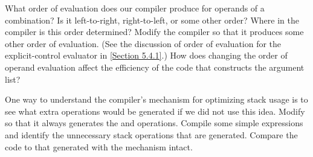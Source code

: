 \begin{exercise}
	\label{Exercise 5.36}
	What order of evaluation does our compiler produce for operands of a combination?
	Is it left-to-right, right-to-left, or some other order?
	Where in the compiler is this order determined?
	Modify the compiler so that it produces some other order of evaluation.
	(See the discussion of order of evaluation for the explicit-control evaluator in \cref{Section 5.4.1}.)
	How does changing the order of operand evaluation affect the efficiency of the code that constructs the argument list?
\end{exercise}



\begin{exercise}
	\label{Exercise 5.37}
	One way to understand the compiler’s  mechanism for optimizing stack usage is to see what extra operations would be generated if we did not use this idea.
	Modify  so that it always generates the  and  operations.
	Compile some simple expressions and identify the unnecessary stack operations that are generated.
	Compare the code to that generated with the  mechanism intact.
\end{exercise}



